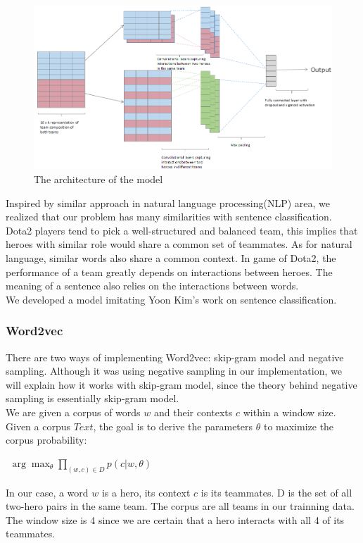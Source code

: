 \documentclass[a4paper, 10pt, conference]{ieeeconf}
\begin{document}
\begin{figure}[b]
	\includegraphics[width=1\textwidth] {architecture.png}
	\caption {The architecture of the model}
\end{figure}

Inspired by similar approach in natural language processing(NLP) area, we realized that our problem has many similarities with sentence classification. Dota2 players tend to pick a well-structured and balanced team, this implies that heroes with similar role would share a common set of teammates. As for natural language, similar words also share a common context. In game of Dota2, the performance of a team greatly depends on interactions between heroes. The meaning of a sentence also relies on the interactions between words. \\

We developed a model imitating Yoon Kim's\cite{kim2014convolutional} work on sentence classification.

\subsubsection{Word2vec}
There are two ways of implementing Word2vec\cite{mikolov2013efficient}: skip-gram model and negative sampling. Although it was using negative sampling in our implementation, we will explain how it works with skip-gram model, since the theory behind negative sampling is essentially skip-gram model.\\
We are given a corpus of words $w$ and their contexts $c$ within a window size. Given a corpus $Text$, the goal is to derive the parameters $\theta$ to maximize the corpus probability\cite{goldberg2014word2vec}:\\
\begin{center}
$\begin{aligned}
\arg\max_{\theta}\prod_{(w,c)\in D}p(c|w,\theta)
\end{aligned}$
\end{center}
In our case, a word $w$ is a hero, its context $c$ is its teammates. D is the set of all two-hero pairs in the same team. The corpus are all teams in our trainning data. The window size is 4 since we are certain that a hero interacts with all 4 of its teammates.
\end{document}
